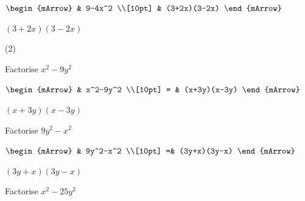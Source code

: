 \begin{mtask}
\begin{exercise}
\begin{envSolution}
			      $\begin{mArrow}
			          & 9-4x^2              \\[10pt]    
					  & (3+2x)(3-2x)
				 \end{mArrow}$
                 \begin{shortsolution}  
				       $(3+2x)(3-2x)$
			     \end{shortsolution}				 
               \end{envSolution}
         \end{exercise}

\end{mtask}


\clearpage\noindent%


\begin{mtask}[resume](2)
   \task \begin{exercise} Factorise $x^2-9y^2$\\
             \begin{envSolution}
			      
			      $\begin{mArrow}
			            & x^2-9y^2                      \\[10pt]    
					  = & (x+3y)(x-3y) 
				 \end{mArrow}$
                 \begin{shortsolution}  
				       $(x+3y)(x-3y)$
			     \end{shortsolution}				 
               \end{envSolution}
         \end{exercise}

   \task \begin{exercise} Factorise $9y^2-x^2$\\
             \begin{envSolution}
			      
			      $\begin{mArrow}
			           & 9y^2-x^2                      \\[10pt]   
                      =& (3y+x)(3y-x) 					   
				 \end{mArrow}$
                 \begin{shortsolution}  
				       $(3y+x)(3y-x)$
			     \end{shortsolution}				 
               \end{envSolution}
         \end{exercise}

   \task \begin{exercise} Factorise $x^2-25y^2$\\
             \begin{envSolution}
			      

\end{envSolution}
\end{exercise}
\end{mtask}
